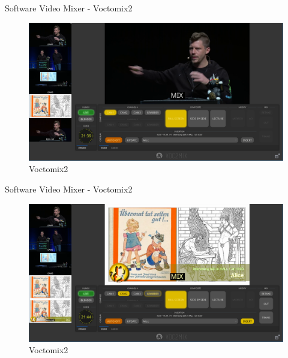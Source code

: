 \documentclass[aspectratio=169]{beamer}
\begin{document}

\begin{frame}{Software Video Mixer - Voctomix2}
	\begin{figure} 
		\centering
		\includegraphics[width=.9\textwidth]{images/voctomix2_1.png}
		\caption{Voctomix2}
	\end{figure}
\end{frame}

\begin{frame}{Software Video Mixer - Voctomix2}
	\begin{figure} 
		\centering
		\includegraphics[width=.9\textwidth]{images/voctomix2_2.png}
		\caption{Voctomix2}
	\end{figure}
\end{frame}
\end{document}

